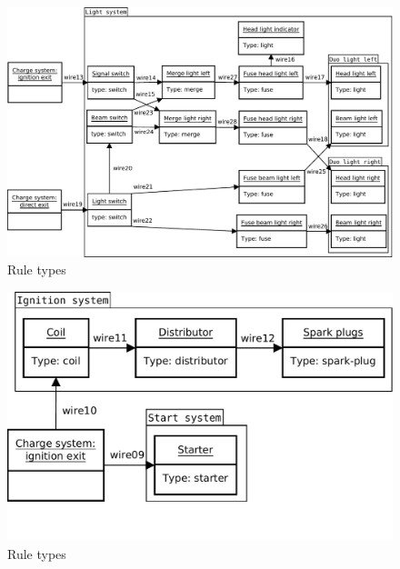 \documentclass[a4paper,10pt]{article}
\begin{document}
\begin{figure}[htbp]
	\centering
		\includegraphics[width=1.00\textwidth]{LightSystem.pdf}
	\caption{Rule types}
	\label{fig:LightSystem}
\end{figure}

\begin{figure}[htbp]
	\centering
		\includegraphics[width=1.00\textwidth]{StartAndIgnitionSystem.pdf}
	\caption{Rule types}
	\label{fig:StartAndIgnitionSystem}
\end{figure}
\end{document}
